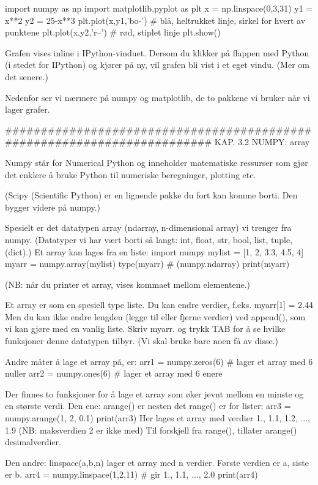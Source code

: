\documentclass[a4paper,11pt,utf8]{book}
\begin{document}
import numpy as np
import matplotlib.pyplot as plt   
x = np.linspace(0,3,31)
y1 = x**2
y2 = 25-x**3
plt.plot(x,y1,'bo-')   # blå, heltrukket linje, sirkel for hvert av punktene  
plt.plot(x,y2,'r--')   # rød, stiplet linje
plt.show()

Grafen vises inline i IPython-vinduet.
Dersom du klikker på flappen med Python (i stedet for IPython) og kjører på ny, 
vil grafen bli vist i et eget vindu.
(Mer om det senere.) 

Nedenfor ser vi nærmere på numpy og matplotlib, de to pakkene vi bruker når vi lager grafer. 



######################################################################## 
KAP. 3.2  NUMPY: array

Numpy står for Numerical Python og inneholder matematiske ressurser 
som gjør det enklere å bruke Python til numeriske beregninger, plotting etc. 

(Scipy (Scientific Python) er en lignende pakke du fort kan komme borti. 
Den bygger videre på numpy.)

Spesielt er det datatypen array (ndarray, n-dimensional array) vi trenger fra numpy. 
(Datatyper vi har vært borti så langt: int, float, str, bool, list, tuple, (dict).) 
Et array kan lages fra en liste:
import numpy
mylist = [1, 2, 3.3, 4.5, 4] 
myarr = numpy.array(mylist) 
type(myarr)    # (numpy.ndarray)
print(myarr)

(NB: når du printer et array, vises kommaet mellom elementene.)  

Et array er som en spesiell type liste. 
Du kan endre verdier, f.eks.
myarr[1] = 2.44
Men du kan ikke endre lengden (legge til eller fjerne verdier) ved append(), 
som vi kan gjøre med en vanlig liste. 
Skriv myarr. og trykk TAB for å se hvilke funksjoner denne datatypen tilbyr. 
(Vi skal bruke bare noen få av disse.) 


Andre måter å lage et array på, er:
arr1 = numpy.zeros(6)    # lager et array med 6 nuller
arr2 = numpy.ones(6)     # lager et array med 6 enere

Der finnes to funksjoner for å lage et array som øker jevnt mellom en minste og en største verdi. 
Den ene: arange() er nesten det range() er for lister: 
arr3 = numpy.arange(1, 2, 0.1) 
print(arr3)
Her lages et array med verdier 1., 1.1, 1.2, ..., 1.9  (NB: maksverdien 2 er ikke med)
Til forskjell fra range(), tillater arange() desimalverdier. 

Den andre: linspace(a,b,n) lager et array med n verdier. Første verdien er a, siste er b. 
arr4 = numpy.linspace(1,2,11)  # gir 1., 1.1, ..., 2.0  
print(arr4)
\end{document}
